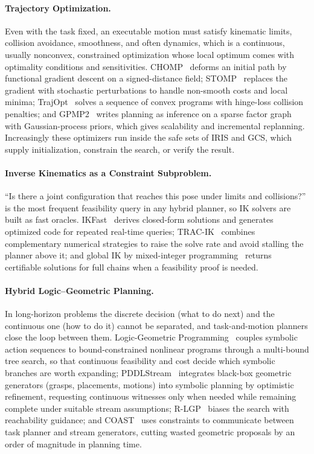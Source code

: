 \paragraph{Trajectory Optimization.}
Even with the task fixed, an executable motion must satisfy kinematic limits, collision avoidance, smoothness, and often dynamics, which is a continuous, usually nonconvex, constrained optimization whose local optimum comes with optimality conditions and sensitivities. CHOMP~\cite{Zucker2013CHOMP} deforms an initial path by functional gradient descent on a signed-distance field; STOMP~\cite{Kalakrishnan2011STOMP} replaces the gradient with stochastic perturbations to handle non-smooth costs and local minima; TrajOpt~\cite{Schulman2014TrajOpt} solves a sequence of convex programs with hinge-loss collision penalties; and GPMP2~\cite{Mukadam2018GPMP2} writes planning as inference on a sparse factor graph with Gaussian-process priors, which gives scalability and incremental replanning. Increasingly these optimizers run inside the safe sets of IRIS and GCS, which supply initialization, constrain the search, or verify the result.

\paragraph{Inverse Kinematics as a Constraint Subproblem.}
``Is there a joint configuration that reaches this pose under limits and collisions?'' is the most frequent feasibility query in any hybrid planner, so IK solvers are built as fast oracles. IKFast~\cite{Diankov2010IKFast} derives closed-form solutions and generates optimized code for repeated real-time queries; TRAC-IK~\cite{Beeson2015TRACIK} combines complementary numerical strategies to raise the solve rate and avoid stalling the planner above it; and global IK by mixed-integer programming~\cite{Dai2019GlobalIK} returns certifiable solutions for full chains when a feasibility proof is needed.

\paragraph{Hybrid Logic--Geometric Planning.}
In long-horizon problems the discrete decision (what to do next) and the continuous one (how to do it) cannot be separated, and task-and-motion planners close the loop between them. Logic-Geometric Programming~\cite{toussaint2015lgp,Toussaint2017LGPcoop} couples symbolic action sequences to bound-constrained nonlinear programs through a multi-bound tree search, so that continuous feasibility and cost decide which symbolic branches are worth expanding; PDDLStream~\cite{garrett2020pddlstream} integrates black-box geometric generators (grasps, placements, motions) into symbolic planning by optimistic refinement, requesting continuous witnesses only when needed while remaining complete under suitable stream assumptions; R-LGP~\cite{Ly2023RLGP} biases the search with reachability guidance; and COAST~\cite{Vu2024COAST} uses constraints to communicate between task planner and stream generators, cutting wasted geometric proposals by an order of magnitude in planning time.

